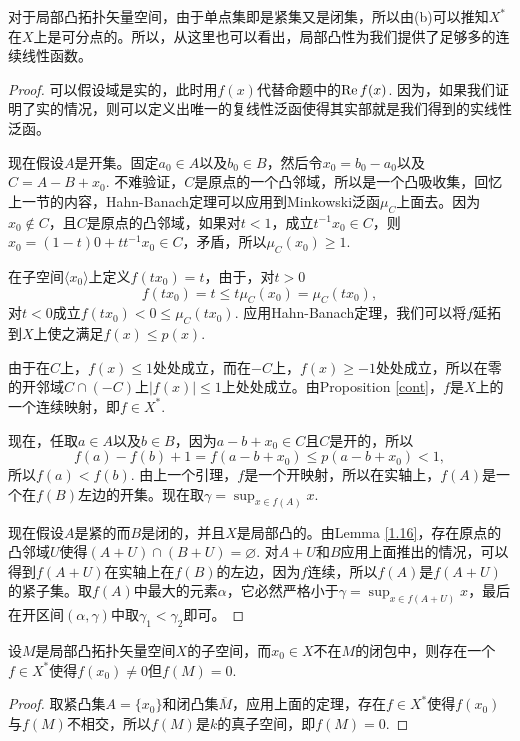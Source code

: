 对于局部凸拓扑矢量空间，由于单点集即是紧集又是闭集，所以由(b)可以推知$X^*$在$X$上是可分点的。所以，从这里也可以看出，局部凸性为我们提供了足够多的连续线性函数。

\begin{proof}
	可以假设域是实的，此时用$f(x)$代替命题中的$\operatorname{Re} f(x)$. 因为，如果我们证明了实的情况，则可以定义出唯一的复线性泛函使得其实部就是我们得到的实线性泛函。

	现在假设$A$是开集。固定$a_0\in A$以及$b_0\in B$，然后令$x_0=b_0-a_0$以及$C=A-B+x_0$. 不难验证，$C$是原点的一个凸邻域，所以是一个凸吸收集，回忆上一节的内容，Hahn-Banach定理可以应用到Minkowski泛函$\mu_C$上面去。因为$x_0\not\in C$，且$C$是原点的凸邻域，如果对$t<1$，成立$t^{-1}x_0\in C$，则$x_0=(1-t)0+tt^{-1}x_0\in C$，矛盾，所以$\mu_C(x_0)\geq 1$.

	在子空间$\langle x_0\rangle$上定义$f(t x_0)=t$，由于，对$t>0$
	\[
	f(tx_0)=t\leq t \mu_C(x_0)=\mu_C(tx_0),
	\]
	对$t<0$成立$f(tx_0)<0\leq \mu_C(tx_0)$. 应用Hahn-Banach定理，我们可以将$f$延拓到$X$上使之满足$f(x)\leq p(x)$.

	由于在$C$上，$f(x)\leq 1$处处成立，而在$-C$上，$f(x)\geq -1$处处成立，所以在零的开邻域$C\cap (-C)$上$|f(x)|\leq 1$上处处成立。由Proposition \ref{cont}，$f$是$X$上的一个连续映射，即$f\in X^*$.

	现在，任取$a\in A$以及$b\in B$，因为$a-b+x_0\in C$且$C$是开的，所以
	\[
	f(a)-f(b)+1=f(a-b+x_0)\leq p(a-b+x_0)<1,
	\]
	所以$f(a)<f(b)$. 由上一个引理，$f$是一个开映射，所以在实轴上，$f(A)$是一个在$f(B)$左边的开集。现在取$\gamma=\sup_{x\in f(A)}x$.

	现在假设$A$是紧的而$B$是闭的，并且$X$是局部凸的。由Lemma \ref{1.16}，存在原点的凸邻域$U$使得$(A+U)\cap (B+U)=\varnothing$. 对$A+U$和$B$应用上面推出的情况，可以得到$f(A+U)$在实轴上在$f(B)$的左边，因为$f$连续，所以$f(A)$是$f(A+U)$的紧子集。取$f(A)$中最大的元素$\alpha$，它必然严格小于$\gamma=\sup_{x\in f(A+U)}x$，最后在开区间$(\alpha,\gamma)$中取$\gamma_1<\gamma_2$即可。
\end{proof}

\begin{pro}[点与子空间的分离]
设$M$是局部凸拓扑矢量空间$X$的子空间，而$x_0\in X$不在$M$的闭包中，则存在一个$f\in X^*$使得$f(x_0)\neq 0$但$f(M)=0$.
\end{pro}

\begin{proof}
取紧凸集$A=\{x_0\}$和闭凸集$\overline{M}$，应用上面的定理，存在$f\in X^*$使得$f(x_0)$与$f(M)$不相交，所以$f(M)$是$k$的真子空间，即$f(M)=0$.
\end{proof}


